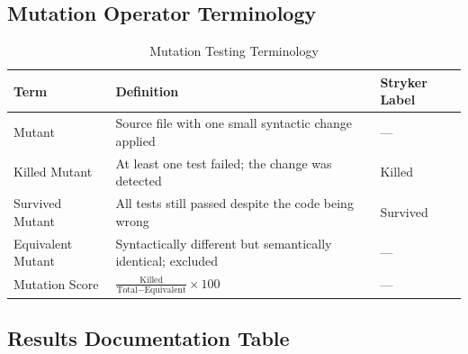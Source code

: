 \documentclass[12pt, a4paper]{article}
\begin{document}
\subsection{Mutation Operator Terminology}

\begin{table}[h!]
\centering
\begin{tabular}{lll}
\toprule
\textbf{Term}             & \textbf{Definition}                                                & \textbf{Stryker Label}      \\
\midrule
Mutant                    & Source file with one small syntactic change applied                & ---                         \\
\textcolor{killed}{Killed Mutant}    & At least one test failed; the change was detected           & Killed                      \\
\textcolor{survived}{Survived Mutant} & All tests still passed despite the code being wrong         & Survived                    \\
Equivalent Mutant         & Syntactically different but semantically identical; excluded       & ---                         \\
Mutation Score            & $\frac{\text{Killed}}{\text{Total} - \text{Equivalent}} \times 100$ & ---                        \\
\bottomrule
\end{tabular}
\caption{Mutation Testing Terminology}
\end{table}

\subsection{Results Documentation Table}
\end{document}
